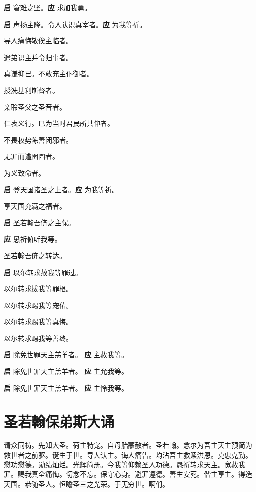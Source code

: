 \documentclass[UTF8,17pt]{ctexart}
\begin{document}
\textbf{启} \quad 窘难之坚。\hfill \textbf{应} \quad 求加我勇。

\textbf{启} \quad 声扬主降。令⼈认识真宰者。\hfill \textbf{应} \quad 为我等祈。

 导⼈痛悔敬俟主临者。

 遣弟识主并令归事者。

 真谦抑已。不敢充主仆御者。

 授洗基利斯督者。

 亲聆圣⽗之圣⾳者。

 仁表义⾏。巳为当时君民所共仰者。

 不畏权势陈善闭邪者。

 ⽆罪⽽遭囹圄者。

 为义致命者。

\textbf{启} \quad 登天国诸圣之上者。\hfill \textbf{应} \quad 为我等祈。

 享天国充满之福者。

\textbf{启} \quad 圣若翰吾侪之主保。

\textbf{应} \quad 恳祈俯听我等。

 圣若翰吾侪之转达。

\textbf{启} \quad 以尔转求赦我等罪过。

 以尔转求拔我等罪根。

 以尔转求赐我等宠佑。

 以尔转求赐我等真悔。

 以尔转求赐我等善终。

\textbf{启} \quad 除免世罪天主羔⽺者。 \hfill \textbf{应} \quad 主赦我等。

\textbf{启} \quad 除免世罪天主羔⽺者。 \hfill \textbf{应} \quad 主允我等。

\textbf{启} \quad 除免世罪天主羔⽺者。 \hfill \textbf{应} \quad 主怜我等。

\section{圣若翰保弟斯⼤诵}

请众同祷。先知⼤圣。荷主特宠。⾃母胎蒙赦者。圣若翰。念尔为吾主天主预简为救世者之前驱。诞⽣于世。导⼈认主。诲⼈痛告。均沾吾主救赎洪恩。克忠克勤。懋功懋德。勋绩灿烂。光辉简册。今我等仰赖圣⼈功德。恳祈转求天主。宽赦我罪。赐我真全痛悔。切念不忘。保守⼼⾝。避罪遵德。善⽣安死。偕主享主。得造天国。恭随圣⼈。恒瞻圣三之光荣。于⽆穷世。啊们。
\end{document}
